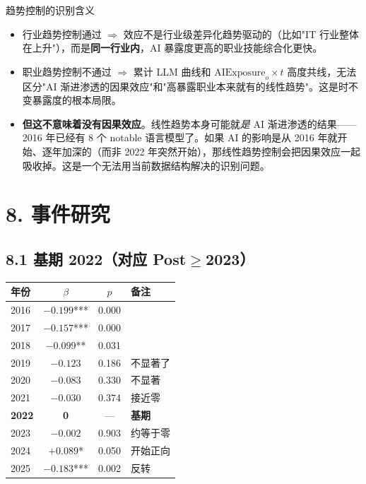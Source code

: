 \documentclass[12pt,a4paper]{article}
\begin{document}
\begin{defbox}{趋势控制的识别含义}
\begin{itemize}
  \item 行业趋势控制通过 $\Rightarrow$ 效应不是行业级差异化趋势驱动的（比如"IT 行业整体在上升"），而是\textbf{同一行业内}，AI 暴露度更高的职业技能综合化更快。
  \item 职业趋势控制不通过 $\Rightarrow$ 累计 LLM 曲线和 $\text{AIExposure}_o \times t$ 高度共线，无法区分"AI 渐进渗透的因果效应"和"高暴露职业本来就有的线性趋势"。这是时不变暴露度的根本局限。
  \item \textbf{但这不意味着没有因果效应}。线性趋势本身可能就\emph{是} AI 渐进渗透的结果——2016 年已经有 8 个 notable 语言模型了。如果 AI 的影响是从 2016 年就开始、逐年加深的（而非 2022 年突然开始），那线性趋势控制会把因果效应一起吸收掉。这是一个无法用当前数据结构解决的识别问题。
\end{itemize}
\end{defbox}

\bigskip

\section*{8. 事件研究}

\subsection*{8.1 基期 2022（对应 Post$\geq$2023）}

\begin{center}
\small
\begin{tabular}{lccl}
\toprule
年份 & $\beta$ & $p$ & 备注 \\
\midrule
2016 & $-0.199$*** & 0.000 & \\
2017 & $-0.157$*** & 0.000 & \\
2018 & $-0.099$** & 0.031 & \\
2019 & $-0.123$ & 0.186 & 不显著了 \\
2020 & $-0.083$ & 0.330 & 不显著 \\
2021 & $-0.030$ & 0.374 & 接近零 \\
\textbf{2022} & \textbf{0} & --- & \textbf{基期} \\
2023 & $-0.002$ & 0.903 & 约等于零 \\
2024 & $+0.089$* & 0.050 & 开始正向 \\
2025 & $-0.183$*** & 0.002 & 反转 \\
\bottomrule
\end{tabular}
\end{center}
\end{document}

